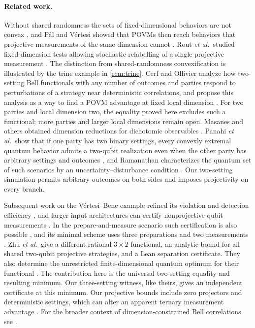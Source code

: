 \documentclass[11pt]{article}
\theoremstyle{definition}
\begin{document}
\paragraph{Related work.}
Without shared randomness the sets of fixed-dimensional behaviors are not
convex \cite{palvertesi2009,donohue2015}, and P\'al and V\'ertesi showed
that POVMs then reach behaviors that projective measurements of the same
dimension cannot \cite{palvertesi2009}.
Rout \emph{et al.}\ studied fixed-dimension tests allowing stochastic
relabelling of a single projective measurement \cite{rout2025}.
The distinction from shared-randomness convexification is illustrated by
the trine example in \cref{rem:trine}. Cerf and Ollivier analyze how
two-setting Bell functionals with any number of outcomes and parties respond
to perturbations of a strategy near deterministic correlations, and propose
this analysis as a way to find a POVM advantage at fixed local dimension
\cite{cerf2026}. For two parties and local dimension two, the equality proved
here excludes such a functional; more parties and larger local dimensions
remain open.
Masanes and others obtained dimension reductions for dichotomic observables
\cite{masanes2005,toner2006}. Panahi \emph{et al.}\ show that if one party
has two binary settings, every convexly extremal quantum behavior admits a
two-qubit realization even when the other party has arbitrary settings and
outcomes \cite{panahi2025}, and Ramanathan characterizes the quantum set of
such scenarios by an uncertainty--disturbance condition
\cite{ramanathan2026}. Our two-setting simulation permits arbitrary
outcomes on both sides and imposes projectivity on every branch.

Subsequent work on the V\'ertesi--Bene example refined its violation and
detection efficiency \cite{barra2012}, and larger input architectures can
certify nonprojective qubit measurements \cite{gomez2016}. In the
prepare-and-measure scenario such certification is also possible
\cite{tavakoli2020}, and its minimal scheme uses three preparations and two
measurements \cite{steinberg2021}.
Zhu \emph{et al.}\ give a different rational \(3\times2\) functional, an
analytic bound for all shared two-qubit projective strategies, and a Lean
separation certificate. They also determine the unrestricted finite-dimensional
quantum optimum for their functional \cite{zhu2026}. The contribution here
is the universal two-setting equality and resulting minimum. Our
three-setting witness, like theirs, gives an independent certificate at this
minimum. Our projective bounds include zero projectors and deterministic
settings, which can alter an apparent ternary measurement advantage
\cite{schwarz2016,schwarz2018corrigendum}. For the broader context of
dimension-constrained Bell correlations see \cite{brunner2014,navascues2015}.
\end{document}
